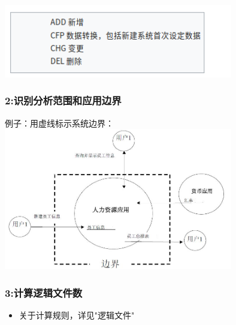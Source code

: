 \begin{description}
\item[]
\end{description}


\includegraphics[width=10cm]{Screenshotfrom2022122020-31-37.png}

\hypertarget{ux8bc6ux522bux5206ux6790ux8303ux56f4ux548cux5e94ux7528ux8fb9ux754c}{%
\subsubsection{2:识别分析范围和应用边界}\label{ux8bc6ux522bux5206ux6790ux8303ux56f4ux548cux5e94ux7528ux8fb9ux754c}}

例子：用虚线标示系统边界：\\

\includegraphics[width=10cm]{功能点计数P6220.jpg}

\hypertarget{ux8ba1ux7b97ux903bux8f91ux6587ux4ef6ux6570}{%
\subsubsection{3:计算逻辑文件数}\label{ux8ba1ux7b97ux903bux8f91ux6587ux4ef6ux6570}}

\begin{itemize}
\tightlist
\item
  关于计算规则，详见"逻辑文件"
\end{itemize}

